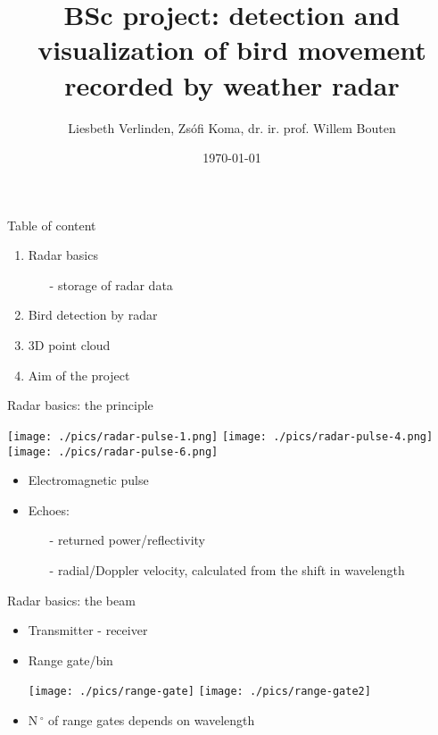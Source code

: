 \documentclass[usenames,dvipsnames]{beamer}
\title[BSc project]{BSc project: detection and visualization of bird movement recorded by weather radar}
\author[L. Verlinden, Z. Koma, W. Bouten]{Liesbeth Verlinden, Zs\'ofi Koma, dr. ir. prof. Willem Bouten}
\date{\today}
\begin{document}
\begin{frame}
	\titlepage
\end{frame}


\begin{frame}{Table of content}
	\begin{enumerate}
		\item Radar basics
		\begin{itemize}
			\item [-] storage of radar data
		\end{itemize}
		\item Bird detection by radar
		\item 3D point cloud
		\item Aim of the project
	\end{enumerate}
\end{frame}


\begin{frame}{Radar basics: the principle}
\begin{center}
	\texttt{[image: ./pics/radar-pulse-1.png]}
	\hspace{1cm}
	\texttt{[image: ./pics/radar-pulse-4.png]}
	\hspace{1cm}
	\texttt{[image: ./pics/radar-pulse-6.png]}
\end{center}

\begin{itemize}
	\item Electromagnetic pulse %
	\item Echoes: 
	\begin{itemize}
		\item[-] returned power/reflectivity
		\item[-] radial/Doppler velocity, calculated from the shift in wavelength
	\end{itemize}
\end{itemize}
\end{frame}


\begin{frame}{Radar basics: the beam}
\begin{itemize}
	\item Transmitter - receiver
	\item Range gate/bin
	\begin{center}
		\texttt{[image: ./pics/range-gate]}
		\vspace{0.5cm}
		\texttt{[image: ./pics/range-gate2]}
	\end{center}
	\item N$\,^{\circ}$ of range gates depends on wavelength
\end{itemize}	
\end{frame}
\end{document}
